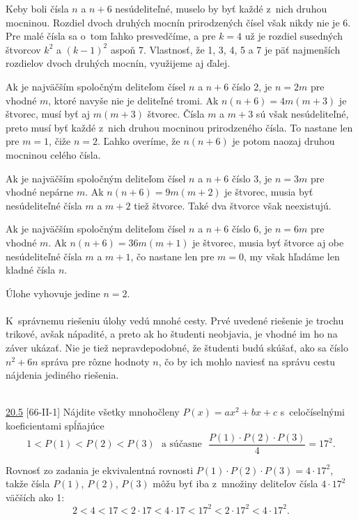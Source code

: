 Keby boli čísla $n$ a $n+6$ nesúdeliteľné, muselo by byť každé z~nich druhou mocninou. Rozdiel dvoch druhých mocnín prirodzených čísel však nikdy nie je 6. Pre malé čísla sa o~tom ľahko presvedčíme, a pre $k = 4$ už je rozdiel susedných štvorcov $k^2$ a $(k - 1)^2$ aspoň 7. Vlastnosť, že 1, 3, 4, 5 a 7 je päť najmenších rozdielov dvoch druhých mocnín, využijeme aj ďalej.

Ak je najväčším spoločným deliteľom čísel $n$ a $n+6$ číslo 2, je $n = 2m$ pre vhodné $m$, ktoré navyše nie je deliteľné tromi. Ak $n(n + 6) = 4m(m + 3)$ je štvorec, musí byť aj $m(m + 3)$ štvorec. Čísla $m$ a $m + 3$ sú však nesúdeliteľné, preto musí byť každé z~nich druhou mocninou prirodzeného čísla. To nastane len pre $m = 1$, čiže $n = 2$. Ľahko overíme, že $n(n + 6)$ je potom naozaj druhou mocninou celého čísla.

Ak je najväčším spoločným deliteľom čísel $n$ a $n + 6$ číslo 3, je $n = 3m$ pre vhodné nepárne $m$. Ak $n(n+6) = 9m(m+2)$ je štvorec, musia byť nesúdeliteľné čísla $m$ a $m+2$ tiež štvorce. Také dva štvorce však neexistujú.

Ak je najväčším spoločným deliteľom čísel $n$ a $n + 6$ číslo 6, je $n = 6m$ pre vhodné $m$. Ak $n(n + 6) = 36m(m + 1)$ je štvorec, musia byť štvorce aj obe nesúdeliteľné čísla $m$ a $m + 1$, čo nastane len pre $m = 0$, my však hľadáme len kladné čísla $n$.

Úlohe vyhovuje jedine $n = 2$.\\
\\
\kom K~správnemu riešeniu úlohy vedú mnohé cesty. Prvé uvedené riešenie je trochu trikové, avšak nápadité, a preto ak ho študenti neobjavia, je vhodné im ho na záver ukázať. Nie je tiež nepravdepodobné, že študenti budú skúšať, ako sa číslo $n^2+6n$ správa pre rôzne hodnoty $n$, čo by ich mohlo naviesť na správu cestu nájdenia jediného riešenia.\\
\\
\begin{tcolorbox}[breakable,notitle,boxrule=0pt,colback=light-gray,colframe=light-gray]\ul{20.5} [66-II-1] Nájdite všetky mnohočleny $P(x) = ax^2 +bx+c$ s~celočíselnými koeficientami spĺňajúce
$$1 < P(1) < P(2) < P(3) \ \ \ \text{a súčasne} \ \  \
\frac{P(1) \cdot P(2) \cdot P(3)}{4}= 17^2.$$

\end{tcolorbox}

\rieh Rovnosť zo zadania je ekvivalentná rovnosti $P(1)\cdot P(2)\cdot P(3) = 4\cdot17^2$, takže čísla $P(1)$, $P(2)$, $P(3)$ môžu byť iba z~množiny deliteľov čísla $4 \cdot 17^2$ väčších ako 1:
$$2 < 4 < 17 < 2 \cdot 17 < 4 \cdot 17 < 17^2< 2 \cdot 17^2< 4 \cdot 17^2.$$

